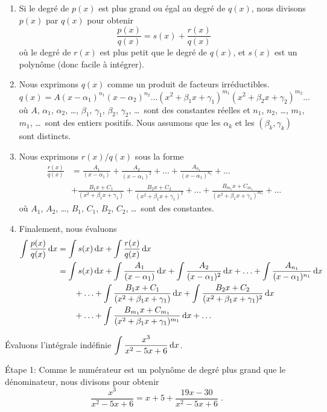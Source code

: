 {\begin{enumerate}
\item Si le degré de $p(x)$ est plus grand ou égal au degré de $q(x)$,
nous divisons $p(x)$ par $q(x)$ pour obtenir
\[
\frac{p(x)}{q(x)} = s(x) + \frac{r(x)}{q(x)}
\]
où le degré de $r(x)$ est plus petit que le degré de $q(x)$, et $s(x)$
est un polynôme (donc facile à intégrer).
\item Nous exprimons $q(x)$ comme un produit de facteurs irréductibles.
\[
q(x) = A(x-\alpha_1)^{n_1}(x-\alpha_2)^{n_2}
\ldots(x^2 +\beta_1 x +\gamma_1)^{m_1}(x^2 +\beta_2 x +\gamma_2)^{m_2}
\ldots
\]
où $A$, $\alpha_1$, $\alpha_2$, \ldots , $\beta_1$, $\gamma_1$,
$\beta_2$, $\gamma_2$, \ldots\ sont des constantes réelles et $n_1$,
$n_2$, \ldots, $m_1$, $m_1$, \ldots\ sont des entiers positifs.  Nous
assumons que les $\alpha_k$ et les $(\beta_k ,\gamma_k)$ sont distincts.
\item Nous exprimons $r(x)/q(x)$ sous la forme
\begin{align*}
\frac{r(x)}{q(x)} &= \frac{A_1}{(x-\alpha_1)} + 
\frac{A_2}{(x-\alpha_1)^2} + \ldots +
\frac{A_{n_1}}{(x-\alpha_1)^{n_1}} + \ldots \\
&+ \frac{B_1x + C_1}{(x^2+\beta_1 x +\gamma_1)} +
\frac{B_2x + C_2}{(x^2+\beta_1 x +\gamma_1)^2} + \ldots +
\frac{B_{m_1}x + C_{m_1}}{(x^2+\beta_1 x +\gamma_1)^{m_1}} + \ldots
\end{align*}
où $A_1$, $A_2$, \ldots , $B_1$, $C_1$, $B_2$, $C_2$, \ldots\ sont des
constantes.
\item Finalement, nous évaluons
\begin{align*}
\int \frac{p(x)}{q(x)} \,\mathrm{d}x &= \int s(x) \,\mathrm{d}x +
\int \frac{r(x)}{q(x)} \,\mathrm{d}x \\
&= \int s(x) \,\mathrm{d}x + \int \frac{A_1}{(x-\alpha_1)} \,\mathrm{d}x + 
\int \frac{A_2}{(x-\alpha_1)^2} \,\mathrm{d}x + \ldots
+ \int \frac{A_{n_1}}{(x-\alpha_1)^{n_1}} \,\mathrm{d}x\\
& \qquad + \ldots + \int \frac{B_1x + C_1}{(x^2+\beta_1 x +\gamma_1)} \,\mathrm{d}x +
\int \frac{B_2x + C_2}{(x^2+\beta_1 x +\gamma_1)^2} \,\mathrm{d}x\\
& \qquad + \ldots
+ \int \frac{B_{m_1}x + C_{m_1}}{(x^2+\beta_1 x +\gamma_1)^{m_1}} \,\mathrm{d}x +
\ldots
\end{align*}
\end{enumerate}

\begin{egg}
Évaluons l'intégrale indéfinie
$\displaystyle \int \frac{x^3}{x^2-5x+6}  \,\mathrm{d}x$.

Étape 1: Comme le numérateur est un polynôme de degré plus grand que
le dénominateur, nous divisons pour obtenir 
\[
\frac{x^3}{x^2-5x+6} = x + 5 + \frac{19x-30}{x^2-5x+6} \; .
\]


\end{egg}}
